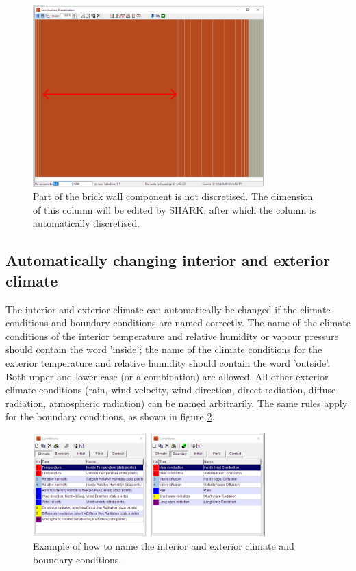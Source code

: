 \documentclass{article}
\begin{document}
\begin{figure}
	\centering
	\includegraphics[width=0.8\textwidth]{./Figures/Dimension}
	\caption{Part of the brick wall component is not discretised. The dimension of this column will be edited by SHARK, after which the column is automatically discretised.}
	\label{fig:dimension}
\end{figure}

\subsection{Automatically changing interior and exterior climate}
The interior and exterior climate can automatically be changed if the climate conditions and boundary conditions are named correctly. The name of the climate conditions of the interior temperature and relative humidity or vapour pressure should contain the word 'inside'; the name of the climate conditions for the exterior temperature and relative humidity should contain the word 'outside'. Both upper and lower case (or a combination) are allowed. All other exterior climate conditions (rain, wind velocity, wind direction, direct radiation, diffuse radiation, atmospheric radiation) can be named arbitrarily. The same rules apply for the boundary conditions, as shown in figure \ref{fig:climatecond}.

\begin{figure}
	\centering
	\includegraphics[width=0.8\textwidth]{./Figures/ClimateBCcond}
	\caption{Example of how to name the interior and exterior climate and boundary conditions.}
	\label{fig:climatecond}
\end{figure}
\end{document}
